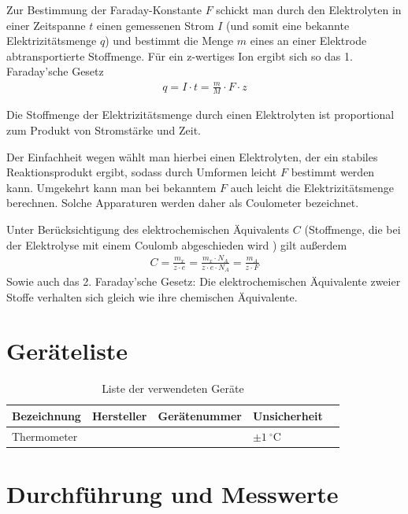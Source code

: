 \documentclass{article}
\begin{document}
Zur Bestimmung der Faraday-Konstante $F$ schickt man durch den Elektrolyten in einer Zeitspanne $t$ einen gemessenen Strom $I$ (und somit eine bekannte Elektrizitätsmenge $q$) und bestimmt die Menge $m$ eines an einer Elektrode abtransportierte Stoffmenge. Für ein z-wertiges Ion ergibt sich so das 1. Faraday'sche Gesetz
\begin{align}
q = I\cdot t = \frac{m}{M} \cdot F \cdot z
\end{align}



Die Stoffmenge der Elektrizitätsmenge durch einen Elektrolyten ist proportional zum Produkt von Stromstärke und Zeit.

Der Einfachheit wegen wählt man hierbei einen Elektrolyten, der ein stabiles Reaktionsprodukt ergibt, sodass durch Umformen leicht $F$ bestimmt werden kann. Umgekehrt kann man bei bekanntem $F$ auch leicht die Elektrizitätsmenge berechnen. Solche Apparaturen werden daher als Coulometer bezeichnet.

Unter Berücksichtigung des elektrochemischen Äquivalents $C$ (Stoffmenge, die bei der Elektrolyse mit einem Coulomb abgeschieden wird \cite{chemie}) gilt außerdem
\begin{align}
C = \frac{m_x}{z\cdot e} = \frac{m_x\cdot N_A}{z\cdot e \cdot N_A} = \frac{m_A}{z\cdot F}
\end{align}
Sowie auch das 2. Faraday'sche Gesetz: Die elektrochemischen Äquivalente zweier Stoffe verhalten sich gleich wie ihre chemischen Äquivalente.





\section{Geräteliste}

\begin{table}[H]
\caption{Liste der verwendeten Geräte}

\begin{tabular}{l|llll}
Bezeichnung & Hersteller & Gerätenummer & Unsicherheit \\
\hline
Thermometer & & & $\pm 1~^\circ$C \\
\end{tabular}

\end{table}




\section{Durchführung und Messwerte}
\end{document}
